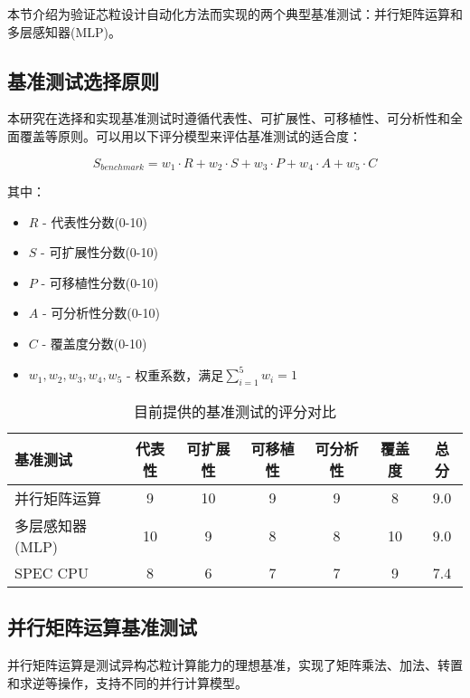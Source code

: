 \documentclass[bachelor]{thesis-uestc}
\begin{document}
本节介绍为验证芯粒设计自动化方法而实现的两个典型基准测试：并行矩阵运算和多层感知器(MLP)。

\subsection{基准测试选择原则}

本研究在选择和实现基准测试时遵循代表性、可扩展性、可移植性、可分析性和全面覆盖等原则。可以用以下评分模型来评估基准测试的适合度：

\begin{equation}
S_{benchmark} = w_1 \cdot R + w_2 \cdot S + w_3 \cdot P + w_4 \cdot A + w_5 \cdot C
\end{equation}

其中：
\begin{itemize}
    \item $R$ - 代表性分数(0-10)
    \item $S$ - 可扩展性分数(0-10)
    \item $P$ - 可移植性分数(0-10)
    \item $A$ - 可分析性分数(0-10)
    \item $C$ - 覆盖度分数(0-10)
    \item $w_1, w_2, w_3, w_4, w_5$ - 权重系数，满足$\sum_{i=1}^{5} w_i = 1$
\end{itemize}

\begin{table}[htbp]
\caption{目前提供的基准测试的评分对比}
\centering
\begin{tabular}{|l|c|c|c|c|c|c|}
\hline
\textbf{基准测试} & \textbf{代表性} & \textbf{可扩展性} & \textbf{可移植性} & \textbf{可分析性} & \textbf{覆盖度} & \textbf{总分} \\
\hline
并行矩阵运算 & 9 & 10 & 9 & 9 & 8 & 9.0 \\
\hline
多层感知器(MLP) & 10 & 9 & 8 & 8 & 10 & 9.0 \\
\hline
SPEC CPU & 8 & 6 & 7 & 7 & 9 & 7.4 \\
\hline
\end{tabular}
\label{tab:benchmark_scores}
\end{table}

\subsection{并行矩阵运算基准测试}

并行矩阵运算是测试异构芯粒计算能力的理想基准，实现了矩阵乘法、加法、转置和求逆等操作，支持不同的并行计算模型。
\end{document}
